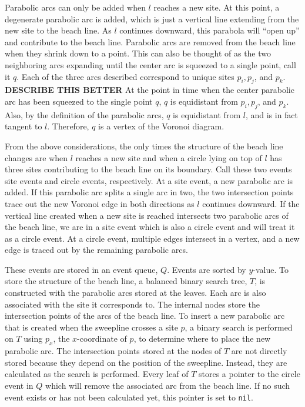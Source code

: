 \documentclass[a4paper, 11pt]{article}
\begin{document}
Parabolic arcs can only be added when $l$ reaches a new site. At this point, a degenerate parabolic arc is added, which is just a vertical line
extending from the new site to the beach line. As $l$ continues downward, this parabola will ``open up'' and contribute to the beach line. Parabolic
arcs are removed from the beach line when they shrink down to a point. This can also be thought of as the two neighboring arcs expanding until the
center arc is squeezed to a single point, call it $q$. Each of the three arcs described correspond to unique sites $p_i, p_j$, and $p_k$.
\textbf{DESCRIBE THIS BETTER} At the point in time when the center parabolic arc has been squeezed to the single point $q$, $q$ is equidistant from
$p_i, p_j$, and $p_k$. Also, by the definition of the parabolic arcs, $q$ is equidistant from $l$, and is in fact tangent to $l$. Therefore, $q$ is a
vertex of the Voronoi diagram.

From the above considerations, the only times the structure of the beach line changes are when $l$ reaches a new site and when a circle lying on top
of $l$ has three sites contributing to the beach line on its boundary. Call these two events site events and circle events, respectively. At a site
event, a new parabolic arc is added. If this parabolic arc splits a single arc in two, the two intersection points trace out the new Voronoi edge in
both directions as $l$ continues downward. If the vertical line created when a new site is reached intersects two parabolic arcs of the beach line, we
are in a site event which is also a circle event and will treat it as a circle event. At a circle event, multiple edges intersect in a vertex, and a
new edge is traced out by the remaining parabolic arcs.

These events are stored in an event queue, $Q$. Events are sorted by $y$-value. To store the structure of the beach line, a balanced binary search
tree, $T$, is constructed with the parabolic arcs stored at the leaves. Each arc is also associated with the
site it corresponds to. The internal nodes store the intersection points of the arcs of the beach line. To insert a new parabolic arc that is created
when the sweepline crosses a site $p$, a binary search is performed on $T$ using $p_x$, the $x$-coordinate of $p$, to determine where to place the new
parabolic arc. The intersection points stored at the nodes of $T$ are not directly stored because they depend on the position of the sweepline.
Instead, they are calculated as the search is performed. Every leaf of $T$ stores a pointer to the circle event in $Q$ which will remove the
associated arc from the beach line. If no such event exists or has not been calculated yet, this pointer is set to \texttt{nil}.
\end{document}
